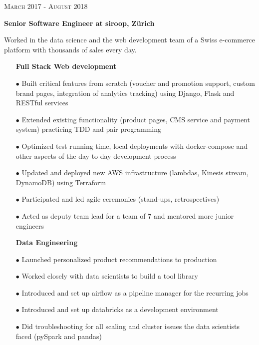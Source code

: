 \documentclass[10pt]{article} %
\begin{document}
\begin{minipage}[t]{0.5\textwidth}
{\raggedleft\textsc{March 2017 - August 2018}\par}

{\raggedright\large \textbf{Senior Software Engineer at siroop, Z\"urich}\\
}

\normalsize{Worked in the data science and the web development team of a Swiss e-commerce platform with thousands of sales every day.}
\begin{itemize}
\item[] \textbf{Full Stack Web development}
\item[$\bullet$] Built critical features from scratch (voucher and promotion support, custom brand pages, integration of analytics tracking) using Django, Flask and RESTful services
\item[$\bullet$] Extended existing functionality (product pages, CMS service and payment system) practicing TDD and pair programming
\item[$\bullet$] Optimized test running time, local deployments with docker-compose and other aspects of the day to day development process
\item[$\bullet$] Updated and deployed new AWS infrastructure (lambdas, Kinesis stream, DynamoDB) using Terraform
\item[$\bullet$] Participated and led agile ceremonies (stand-ups, retrospectives)
\item[$\bullet$] Acted as deputy team lead for a team of 7 and mentored more junior engineers
\end{itemize}

\begin{itemize}
\item[] \textbf{Data Engineering}
\item[$\bullet$] Launched personalized product recommendations to production
\item[$\bullet$] Worked closely with data scientists to build a tool library
\item[$\bullet$] Introduced and set up airflow as a pipeline manager for the recurring jobs
\item[$\bullet$] Introduced and set up databricks as a development environment
\item[$\bullet$] Did troubleshooting for all scaling and cluster issues the data scientists faced (pySpark and pandas)
\end{itemize}





\end{minipage}
\end{document}

